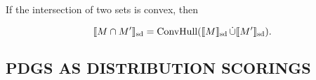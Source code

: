 \documentclass{article}
\newcommand\SD{_{\text{sd}}}
\newcommand{\MN}{PDG}
\newcommand{\MNs}{\MN s}
\numberwithin{equation}{section}
\begin{document}
	\begin{vfull}
	If the intersection of two sets is convex, then 
	\begin{conj}\label{prop:intersect-set-semantics}
		$$\bbr{M \cap M'}\SD = \text{ConvHull}(\bbr{M}\SD \mathop{\dot\cup} \bbr{M'}\SD).$$
	\end{conj}
	\end{vfull}
	






       	\subsection{\MN S AS DISTRIBUTION SCORINGS} \label{sec:weighted-semantics} 
        
\end{document}
